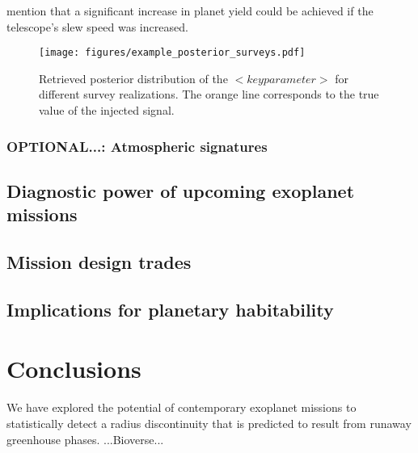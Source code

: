 \documentclass[modern]{aastex631}
\begin{document}
\begin{note}
    \citet{Penny2019} mention that a significant increase in planet yield could be achieved if the telescope's slew speed was increased.
\end{note}

\begin{figure}[ht!]
    \begin{centering}

        \texttt{[image: figures/example\_posterior\_surveys.pdf]}
        \caption{
            Retrieved posterior distribution of the $<key parameter>$ for different survey realizations.
            The orange line corresponds to the true value of the injected signal.
        }
        \label{fig:posterior_surveys}
    \end{centering}
\end{figure}

\subsubsection{OPTIONAL...: Atmospheric signatures}


\subsection{Diagnostic power of upcoming exoplanet missions}

\subsection{Mission design trades}\label{sec:mission-design-trades}

\subsection{Implications for planetary habitability}\label{sec:habitability}



\section{Conclusions}
\begin{note}
    We have explored the potential of contemporary exoplanet missions to statistically detect a radius discontinuity that is predicted to result from runaway greenhouse phases.
    ...Bioverse...
\end{note}
\end{document}

